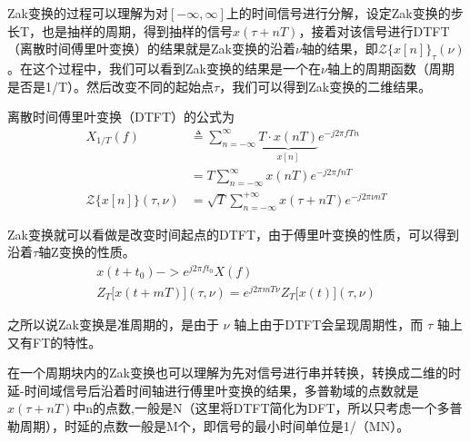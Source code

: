 \documentclass[12pt,a4paper]{article}%
\begin{document}
	Zak变换的过程可以理解为对$[-\infty,\infty]$上的时间信号进行分解，设定Zak变换的步长T，也是抽样的周期，得到抽样的信号$x(\tau+nT)$，接着对该信号进行DTFT（离散时间傅里叶变换）的结果就是Zak变换的沿着$\nu$轴的结果，即$\mathcal{Z}\{x[n]\}_\tau(\nu)$。在这个过程中，我们可以看到Zak变换的结果是一个在$\nu$轴上的周期函数（周期是否是1/T）。然后改变不同的起始点$\tau$，我们可以得到Zak变换的二维结果。
	
	离散时间傅里叶变换（DTFT）的公式为
	\begin{equation}
		\label{eq301}
		\begin{aligned}
			X_{1/T}(f)&\triangleq\sum_{n=-\infty}^\infty\underbrace{T\cdot x(nT)}_{x[n]}e^{-j2\pi fTn} \\&= T\sum_{n=-\infty}^\infty x(nT)e^{-j2\pi fnT}\\
			\mathcal{Z}\{x[n]\}(\tau, \nu) &= \sqrt{T} \sum_{n = -\infty}^{+\infty} x(\tau + nT)e^{-j2\pi \nu nT}
		\end{aligned}
	\end{equation}
	
	Zak变换就可以看做是改变时间起点的DTFT，由于傅里叶变换的性质，可以得到沿着$\tau$轴Z变换的性质。
	\begin{equation}
		\label{eq302}
		\begin{aligned}
			x(t+t_0) -> e^{j2\pi ft_0}X(f)\\
			Z_T\Big[x(t+mT)\Big](\tau,\nu)=e^{j2\pi mT\nu}Z_T\Big[x(t)\Big](\tau,\nu)
		\end{aligned}
	\end{equation}

	之所以说Zak变换是准周期的，是由于 $\nu$ 轴上由于DTFT会呈现周期性，而 $\tau$ 轴上又有FT的特性。

	在一个周期块内的Zak变换也可以理解为先对信号进行串并转换，转换成二维的时延-时间域信号后沿着时间轴进行傅里叶变换的结果，多普勒域的点数就是$x(\tau+nT)$中n的点数,一般是N（这里将DTFT简化为DFT，所以只考虑一个多普勒周期），时延的点数一般是M个，即信号的最小时间单位是1/（MN）。
\end{document}
